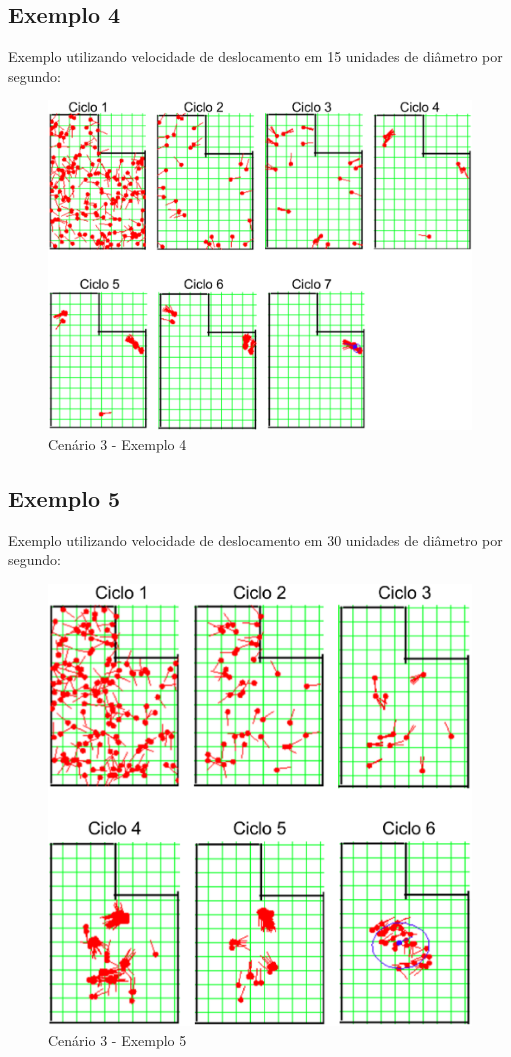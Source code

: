 \subsection{Exemplo 4}

Exemplo utilizando velocidade de deslocamento em 15 unidades de diâmetro por segundo:

\begin{figure}[H]
  \centering
  \includegraphics[scale=0.4]{figuras/cen3_ex4.eps}
  \caption[Cenário 3 - Exemplo 4]{Cenário 3 - Exemplo 4}
  \label{img:cen3_ex4}
\end{figure}

\subsection{Exemplo 5}

Exemplo utilizando velocidade de deslocamento em 30 unidades de diâmetro por segundo:

\begin{figure}[H]
  \centering
  \includegraphics[scale=0.4]{figuras/cen3_ex5.eps}
  \caption[Cenário 3 - Exemplo 5]{Cenário 3 - Exemplo 5}
  \label{img:cen3_ex5}
\end{figure}
